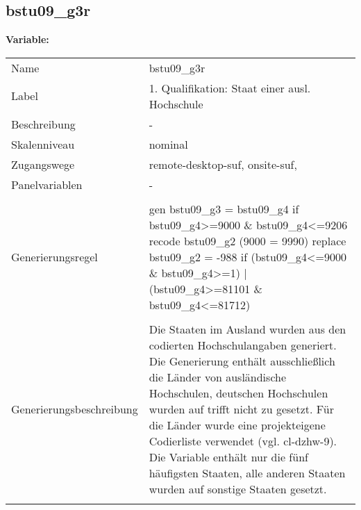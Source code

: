 	
	
	\subsection{bstu09\_g3r}
	\label{subSection:bstu09_g3r}

	\noindent\textbf{Variable:}\\
		\begin{tabular}{lL{11.3cm}}
			\label{tableVariable:bstu09_g3r}
			Name & bstu09\_g3r \\
			Label & 1. Qualifikation: Staat einer ausl. Hochschule \\
			Beschreibung & - \\
			Skalenniveau & nominal \\
			Zugangswege &
				remote-desktop-suf,
				onsite-suf,
 \\
			Panelvariablen & -
			 \\
			 \\
					Generierungsregel & gen bstu09\_g3 = bstu09\_g4 if bstu09\_g4\textgreater{}=9000 \& bstu09\_g4\textless{}=9206
recode bstu09\_g2 (9000 = 9990)
replace bstu09\_g2 = -988 if (bstu09\_g4\textless{}=9000 \& bstu09\_g4\textgreater{}=1) | (bstu09\_g4\textgreater{}=81101 \& bstu09\_g4\textless{}=81712) \\
				 \\
					Generierungsbeschreibung & Die Staaten im Ausland wurden aus den codierten Hochschulangaben generiert. Die Generierung enthält ausschließlich die Länder von ausländische Hochschulen, deutschen Hochschulen wurden auf trifft nicht zu gesetzt. Für die Länder wurde eine projekteigene Codierliste verwendet (vgl. cl-dzhw-9). Die Variable enthält nur die fünf häufigsten Staaten, alle anderen Staaten wurden auf sonstige Staaten gesetzt. 
				 \\	
			 \\
		\end{tabular}






